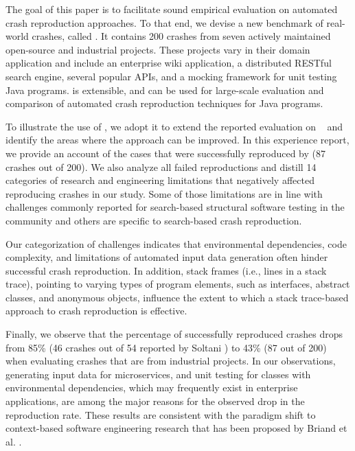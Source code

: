 The goal of this paper is to facilitate sound empirical evaluation on automated crash reproduction approaches.
To that end, we devise a new benchmark of real-world crashes, called \crashpack.
It contains 200 crashes from seven actively maintained open-source and industrial projects.
These projects vary in their domain application and include an enterprise wiki application, a distributed RESTful search engine, several popular APIs, and a mocking framework for unit testing Java programs. 
\crashpack is extensible, and can be used for large-scale evaluation and comparison of automated crash reproduction techniques for Java programs.

To illustrate the use of \crashpack, we adopt it to extend the reported evaluation on \evocrash~\cite{soltani2017} and identify the areas where the approach can be improved.
In this experience report, we provide an account of the cases that were successfully reproduced by \evocrash (87 crashes out of 200). 
We also analyze all failed reproductions and distill 14 categories of research and engineering limitations that negatively affected reproducing crashes in our study. 
Some of those limitations are in line with challenges commonly reported for search-based structural software testing in the community \cite{xiao2011precise, McMinn2011, Fraser2014b} and others are specific to search-based crash reproduction.

Our categorization of challenges indicates that environmental dependencies, code complexity, and limitations of automated input data generation often hinder successful crash reproduction.
In addition, stack frames (i.e., lines in a stack trace), pointing to varying types of program elements, such as interfaces, abstract classes, and anonymous objects, influence the extent to which a stack trace-based approach to crash reproduction is effective.

Finally, we observe that the percentage of successfully reproduced crashes drops from 85\% (46 crashes out of 54 reported by Soltani \etal \cite{Soltani2018a}) to 43\% (87 out of 200) when evaluating crashes that are from industrial projects. 
In our observations, generating input data for microservices, and unit testing for classes with environmental dependencies, which may frequently exist in enterprise applications, are among the major reasons for the observed drop in the reproduction rate.
These results are consistent with the paradigm shift to context-based software engineering research that has been proposed by Briand et al. \cite{Briand2017a}.

